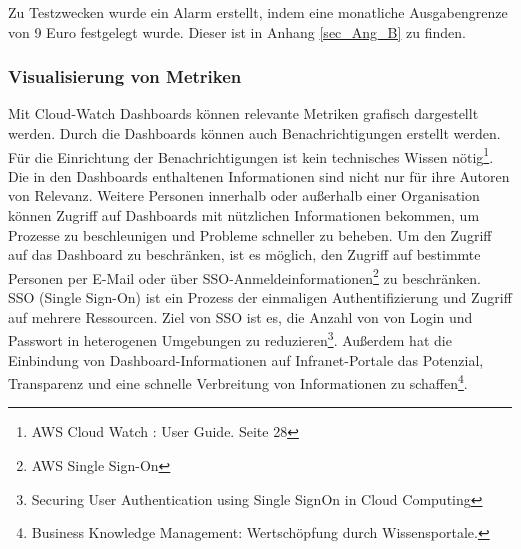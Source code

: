 Zu Testzwecken wurde ein Alarm erstellt, indem eine monatliche Ausgabengrenze von 9 Euro festgelegt wurde. Dieser ist in Anhang \ref{sec_Ang_B} zu finden.
\subsubsection*{Visualisierung von Metriken}
Mit Cloud-Watch Dashboards können relevante Metriken grafisch dargestellt werden. %
Durch die Dashboards können auch Benachrichtigungen erstellt werden. Für die Einrichtung der Benachrichtigungen ist kein technisches Wissen nötig\footnote{\cite{AMZ14}AWS Cloud Watch : User Guide. Seite 28}.
Die in den Dashboards enthaltenen Informationen sind nicht nur für ihre Autoren von Relevanz. Weitere Personen innerhalb oder außerhalb einer Organisation können Zugriff auf Dashboards mit nützlichen Informationen bekommen, um Prozesse zu beschleunigen und Probleme schneller zu beheben. Um den Zugriff auf das Dashboard zu beschränken, ist es möglich, den Zugriff auf bestimmte Personen per E-Mail oder über SSO-Anmeldeinformationen\footnote{\cite{AMZ33} AWS Single Sign-On} zu beschränken. SSO (Single Sign-On) ist ein Prozess der einmaligen Authentifizierung und Zugriff auf mehrere Ressourcen. Ziel von SSO ist es, die Anzahl von von Login und Passwort in heterogenen Umgebungen zu reduzieren\footnote{\cite{SSO}Securing User Authentication using Single SignOn in Cloud Computing}. Außerdem hat die Einbindung von Dashboard-Informationen auf Infranet-Portale das Potenzial, Transparenz und eine schnelle Verbreitung von Informationen zu schaffen\footnote{\cite{BKM}Business Knowledge Management: Wertschöpfung durch Wissensportale.}. 
